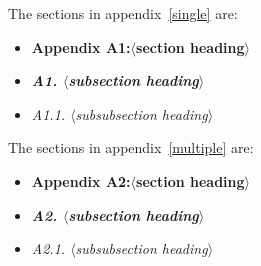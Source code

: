\documentclass{cje}          %
\theoremstyle{plain}%
\theoremstyle{definition}
\theoremstyle{remark}
\begin{document}
The sections in appendix~\ref{single} are:
  \begin{itemize}
    \item \textbf{Appendix A1:\enskip $\langle$section heading$\rangle$}
    \item {\bfseries\textit{A1. $\langle$subsection heading$\rangle$}} 
    \item \textit{A1.1. $\langle$subsubsection heading$\rangle$}
  \end{itemize} 
The sections in appendix~\ref{multiple} are:
  \begin{itemize}
    \item \textbf{Appendix A2:\enskip $\langle$section heading$\rangle$}
    \item {\bfseries\textit{A2. $\langle$subsection heading$\rangle$}} 
    \item \textit{A2.1. $\langle$subsubsection heading$\rangle$}
  \end{itemize} 


\end{document}
